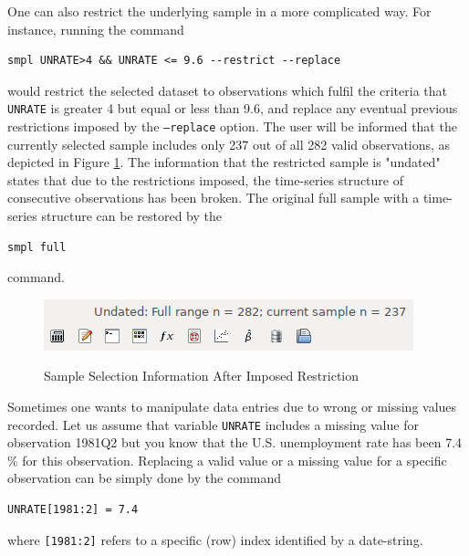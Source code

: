 \documentclass[11pt]{article}
\begin{document}
One can also restrict the underlying sample in a more complicated way. For instance, running the command 
\begin{Verbatim}[baselinestretch=0.75, fontsize=\small]
smpl UNRATE>4 && UNRATE <= 9.6 --restrict --replace
\end{Verbatim}
would restrict the selected dataset to observations which fulfil the criteria that \texttt{UNRATE} is greater 4 but equal or less than 9.6, and replace any eventual previous restrictions imposed by the \texttt{---replace} option. %
The user will be informed that the currently selected sample includes only 237 out of all 282 valid observations, as depicted in Figure \ref{fig:smpl}. The information that the restricted sample is "undated" states that due to the restrictions imposed, the time-series structure of consecutive observations has been broken. The original full sample with a time-series structure can be restored by the
\begin{Verbatim}[baselinestretch=0.75, fontsize=\small]
smpl full
\end{Verbatim}
command.


\begin{figure}[!h]
	\centering
	\caption{Sample Selection Information After Imposed Restriction}
	\includegraphics[width=.42\textwidth]{../figures/smpl_restrict}
	\label{fig:smpl}
\end{figure}

Sometimes one wants to manipulate data entries due to wrong or missing values recorded. Let us assume that variable \texttt{UNRATE} includes a missing value for observation 1981Q2 but you know that the U.S. unemployment rate has been 7.4 \% for this observation. Replacing a valid value or a missing value for a specific observation can be simply done by the command
\begin{Verbatim}[baselinestretch=0.75, fontsize=\small]
UNRATE[1981:2] = 7.4
\end{Verbatim}
where \texttt{[1981:2]} refers to a specific (row) index identified by a date-string.%
\end{document}

